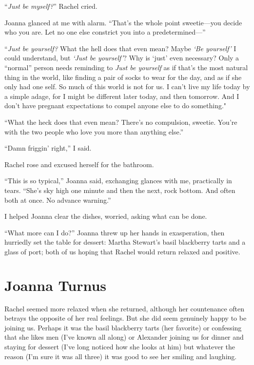 ``\emph{Just be myself?}'' Rachel cried.

Joanna glanced at me with alarm. ``That's the whole point sweetie---you
decide who you are. Let no one else constrict you into a
pre\-de\-ter\-mined---''

``\emph{Just be yourself?} What the hell does that even mean? Maybe
\emph{`Be yourself'} I could understand, but \emph{`Just be yourself'}?
Why is `just' even necessary? Only a ``normal'' person needs reminding
to \emph{Just be yourself} as if that's the most natural thing in the
world, like finding a pair of socks to wear for the day, and as if she
only had one self. So much of this world is not for us. I can't live my
life today by a simple adage, for I might be different later today, and
then tomorrow. And I don't have pregnant expectations to compel anyone
else to do something."

``What the heck does that even mean? There's no compulsion, sweetie.
You're with the two people who love you more than anything else.''

``Damn friggin' right,'' I said.

Rachel rose and excused herself for the bathroom.

``This is so typical,'' Joanna said, exchanging glances with me,
practically in tears. ``She's sky high one minute and then the next,
rock bottom. And often both at once. No advance warning.''

I helped Joanna clear the dishes, worried, asking what can be done.

``What more can I do?'' Joanna threw up her hands in exasperation, then
hurriedly set the table for dessert: Martha Stewart's basil blackberry
tarts and a glass of port; both of us hoping that Rachel would return
relaxed and positive.

\chapter{Joanna Turnus}

\titlemark

Rachel seemed more relaxed when she returned, although her countenance
often betrays the opposite of her real feelings. But she did seem
genuinely happy to be joining us. Perhaps it was the basil blackberry
tarts (her favorite) or confessing that she likes men (I've known all
along) or Alexander joining us for dinner and staying for dessert (I've
long noticed how she looks at him) but whatever the reason (I'm sure it
was all three) it was good to see her smiling and laughing.

